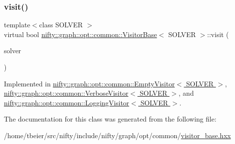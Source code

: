 \mbox{\label{classnifty_1_1graph_1_1opt_1_1common_1_1VisitorBase_aaeef625f11705918d3fdd05f2550a879}} 
\subsubsection{\texorpdfstring{visit()}{visit()}}
{\footnotesize\ttfamily template$<$class S\+O\+L\+V\+ER $>$ \\
virtual bool \hyperlink{classnifty_1_1graph_1_1opt_1_1common_1_1VisitorBase}{nifty\+::graph\+::opt\+::common\+::\+Visitor\+Base}$<$ S\+O\+L\+V\+ER $>$\+::visit (\begin{DoxyParamCaption}\item[{\hyperlink{classnifty_1_1graph_1_1opt_1_1common_1_1VisitorBase_a433d03139897d4aefe27315b2bbb3adc}{Solver\+Type} $\ast$}]{solver }\end{DoxyParamCaption})\hspace{0.3cm}{\ttfamily [pure virtual]}}



Implemented in \hyperlink{classnifty_1_1graph_1_1opt_1_1common_1_1EmptyVisitor_a709039dcb9c0d178ba45a7182c58388d}{nifty\+::graph\+::opt\+::common\+::\+Empty\+Visitor$<$ S\+O\+L\+V\+E\+R $>$}, \hyperlink{classnifty_1_1graph_1_1opt_1_1common_1_1VerboseVisitor_afa21c42d9fa10fe8be09d55c4a51c49e}{nifty\+::graph\+::opt\+::common\+::\+Verbose\+Visitor$<$ S\+O\+L\+V\+E\+R $>$}, and \hyperlink{classnifty_1_1graph_1_1opt_1_1common_1_1LoggingVisitor_a0079f597f09fae363906092f00df126b}{nifty\+::graph\+::opt\+::common\+::\+Logging\+Visitor$<$ S\+O\+L\+V\+E\+R $>$}.



The documentation for this class was generated from the following file\+:\begin{DoxyCompactItemize}
\item 
/home/tbeier/src/nifty/include/nifty/graph/opt/common/\hyperlink{visitor__base_8hxx}{visitor\+\_\+base.\+hxx}\end{DoxyCompactItemize}
